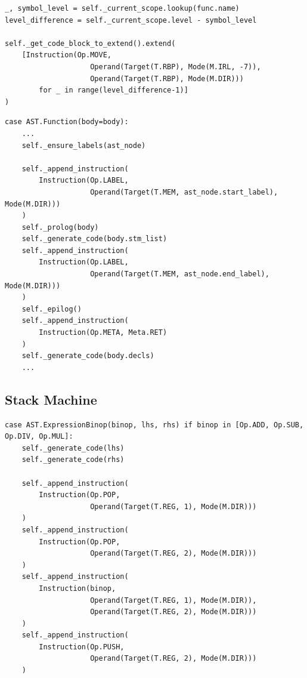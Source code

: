 \begin{verbatim}
_, symbol_level = self._current_scope.lookup(func.name)
level_difference = self._current_scope.level - symbol_level

self._get_code_block_to_extend().extend(
    [Instruction(Op.MOVE,
                    Operand(Target(T.RBP), Mode(M.IRL, -7)),
                    Operand(Target(T.RBP), Mode(M.DIR)))
        for _ in range(level_difference-1)]
)
\end{verbatim}

\begin{verbatim}
case AST.Function(body=body):
    ...
    self._ensure_labels(ast_node)

    self._append_instruction(
        Instruction(Op.LABEL,
                    Operand(Target(T.MEM, ast_node.start_label), Mode(M.DIR)))
    )
    self._prolog(body)
    self._generate_code(body.stm_list)
    self._append_instruction(
        Instruction(Op.LABEL,
                    Operand(Target(T.MEM, ast_node.end_label), Mode(M.DIR)))
    )
    self._epilog()
    self._append_instruction(
        Instruction(Op.META, Meta.RET)
    )
    self._generate_code(body.decls)
    ...
\end{verbatim}

\newpage

\subsection{Stack Machine}
\begin{verbatim}
case AST.ExpressionBinop(binop, lhs, rhs) if binop in [Op.ADD, Op.SUB, Op.DIV, Op.MUL]:
    self._generate_code(lhs)
    self._generate_code(rhs)

    self._append_instruction(
        Instruction(Op.POP,
                    Operand(Target(T.REG, 1), Mode(M.DIR)))
    )
    self._append_instruction(
        Instruction(Op.POP,
                    Operand(Target(T.REG, 2), Mode(M.DIR)))
    )
    self._append_instruction(
        Instruction(binop,
                    Operand(Target(T.REG, 1), Mode(M.DIR)),
                    Operand(Target(T.REG, 2), Mode(M.DIR)))
    )
    self._append_instruction(
        Instruction(Op.PUSH,
                    Operand(Target(T.REG, 2), Mode(M.DIR)))
    )
\end{verbatim}

\newpage


